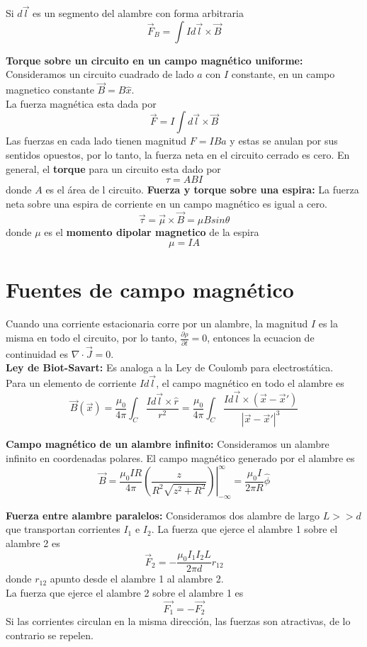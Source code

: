 \documentclass[a4paper, 10pt]{article}
\begin{document}
\begin{multicols*}{2}
	Si $d\vec{l}$ es un segmento del alambre con forma arbitraria
	$$\vec{F}_B = \int I d\vec{l}\times\vec{B}$$
	    
	\textbf{Torque sobre un circuito en un campo magnético uniforme: }Consideramos un circuito cuadrado de lado $a$ con $I$ constante, en un campo magnetico constante $\vec{B}=B\hat{x}$.\\
	La fuerza magnética esta dada por
	$$\vec{F}=I\int d\vec{l}\times \vec{B}$$
	Las fuerzas en cada lado tienen magnitud $F=IBa$ y estas se anulan por sus sentidos opuestos, por lo tanto, la fuerza neta en el circuito cerrado es cero. 
	En general, el \textbf{torque} para un circuito esta dado por
	$$\tau=ABI$$
	donde $A$ es el área de l circuito.
	\textbf{Fuerza y torque sobre una espira: }La fuerza neta sobre una espira de corriente en un campo magnético es igual a cero.
	$$\vec{\tau} = \vec{\mu}\times\vec{B} = \mu B sin \theta $$
	donde $\mu$ es el \textbf{momento dipolar magnetico} de la espira 
	$$\mu =IA$$
	    
	\section{Fuentes de campo magnético}
	Cuando una corriente estacionaria corre por un alambre, la magnitud $I$ es la misma en todo el circuito, por lo tanto, $\frac{\partial \rho}{\partial t}=0$, entonces la ecuacion de continuidad es $\nabla \cdot \vec{J}=0$.\\
	    
	\textbf{Ley de Biot-Savart: }Es analoga a la Ley de Coulomb para electrostática.\\
	Para un elemento de corriente $Id\vec{l}$, el campo magnético en todo el alambre es
	$$\vec{B}(\vec{x})=\frac{\mu _0}{4\pi}\int_C \frac{Id\vec{l}\times \hat{r}}{r^2}=\frac{\mu _0}{4\pi}\int_C \frac{Id\vec{l}\times (\vec{x}-\vec{x}')}{|\vec{x}-\vec{x}'|^3}$$
	    
	\textbf{Campo magnético de un alambre infinito:} Consideramos un alambre infinito en coordenadas polares. El campo magnético generado por el alambre es
	$$\vec{B}= \left.\frac{\mu_0 IR}{4\pi}\left(\frac{z}{R^2\sqrt{z^2+R^2}}\right)\right| _{-\infty}^{\infty}=\frac{\mu_0I}{2\pi R}\hat{\phi}$$
	    
	\textbf{Fuerza entre alambre paralelos: }Consideramos dos alambre de largo $L>>d$ que transportan corrientes $I_1$ e $I_2$. La fuerza que ejerce el alambre 1 sobre el alambre 2 es
	$$\vec{F}_2 = -\frac{\mu_0 I_1 I_2 L}{2 \pi d} r_{12}$$
	donde $r_{12}$ apunto desde el alambre 1 al alambre 2.\\
	La fuerza que ejerce el alambre 2 sobre el alambre 1 es
	$$\vec{F_1} = - \vec{F_2}$$
	Si las corrientes circulan en la misma dirección, las fuerzas son atractivas, de lo contrario se repelen.\\
	    

\end{multicols*}
\end{document}
